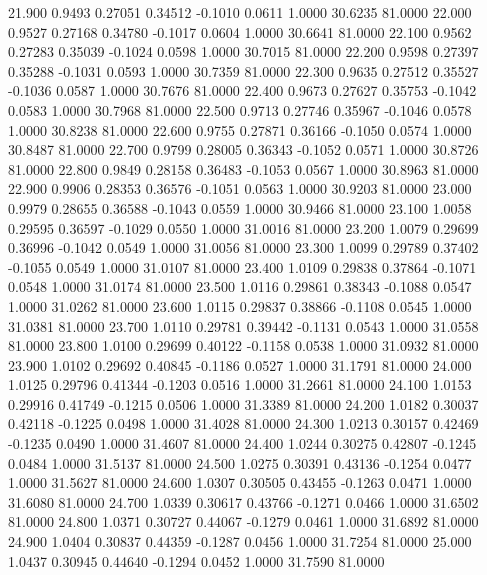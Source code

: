   21.900   0.9493   0.27051   0.34512  -0.1010   0.0611   1.0000  30.6235  81.0000
  22.000   0.9527   0.27168   0.34780  -0.1017   0.0604   1.0000  30.6641  81.0000
  22.100   0.9562   0.27283   0.35039  -0.1024   0.0598   1.0000  30.7015  81.0000
  22.200   0.9598   0.27397   0.35288  -0.1031   0.0593   1.0000  30.7359  81.0000
  22.300   0.9635   0.27512   0.35527  -0.1036   0.0587   1.0000  30.7676  81.0000
  22.400   0.9673   0.27627   0.35753  -0.1042   0.0583   1.0000  30.7968  81.0000
  22.500   0.9713   0.27746   0.35967  -0.1046   0.0578   1.0000  30.8238  81.0000
  22.600   0.9755   0.27871   0.36166  -0.1050   0.0574   1.0000  30.8487  81.0000
  22.700   0.9799   0.28005   0.36343  -0.1052   0.0571   1.0000  30.8726  81.0000
  22.800   0.9849   0.28158   0.36483  -0.1053   0.0567   1.0000  30.8963  81.0000
  22.900   0.9906   0.28353   0.36576  -0.1051   0.0563   1.0000  30.9203  81.0000
  23.000   0.9979   0.28655   0.36588  -0.1043   0.0559   1.0000  30.9466  81.0000
  23.100   1.0058   0.29595   0.36597  -0.1029   0.0550   1.0000  31.0016  81.0000
  23.200   1.0079   0.29699   0.36996  -0.1042   0.0549   1.0000  31.0056  81.0000
  23.300   1.0099   0.29789   0.37402  -0.1055   0.0549   1.0000  31.0107  81.0000
  23.400   1.0109   0.29838   0.37864  -0.1071   0.0548   1.0000  31.0174  81.0000
  23.500   1.0116   0.29861   0.38343  -0.1088   0.0547   1.0000  31.0262  81.0000
  23.600   1.0115   0.29837   0.38866  -0.1108   0.0545   1.0000  31.0381  81.0000
  23.700   1.0110   0.29781   0.39442  -0.1131   0.0543   1.0000  31.0558  81.0000
  23.800   1.0100   0.29699   0.40122  -0.1158   0.0538   1.0000  31.0932  81.0000
  23.900   1.0102   0.29692   0.40845  -0.1186   0.0527   1.0000  31.1791  81.0000
  24.000   1.0125   0.29796   0.41344  -0.1203   0.0516   1.0000  31.2661  81.0000
  24.100   1.0153   0.29916   0.41749  -0.1215   0.0506   1.0000  31.3389  81.0000
  24.200   1.0182   0.30037   0.42118  -0.1225   0.0498   1.0000  31.4028  81.0000
  24.300   1.0213   0.30157   0.42469  -0.1235   0.0490   1.0000  31.4607  81.0000
  24.400   1.0244   0.30275   0.42807  -0.1245   0.0484   1.0000  31.5137  81.0000
  24.500   1.0275   0.30391   0.43136  -0.1254   0.0477   1.0000  31.5627  81.0000
  24.600   1.0307   0.30505   0.43455  -0.1263   0.0471   1.0000  31.6080  81.0000
  24.700   1.0339   0.30617   0.43766  -0.1271   0.0466   1.0000  31.6502  81.0000
  24.800   1.0371   0.30727   0.44067  -0.1279   0.0461   1.0000  31.6892  81.0000
  24.900   1.0404   0.30837   0.44359  -0.1287   0.0456   1.0000  31.7254  81.0000
  25.000   1.0437   0.30945   0.44640  -0.1294   0.0452   1.0000  31.7590  81.0000
